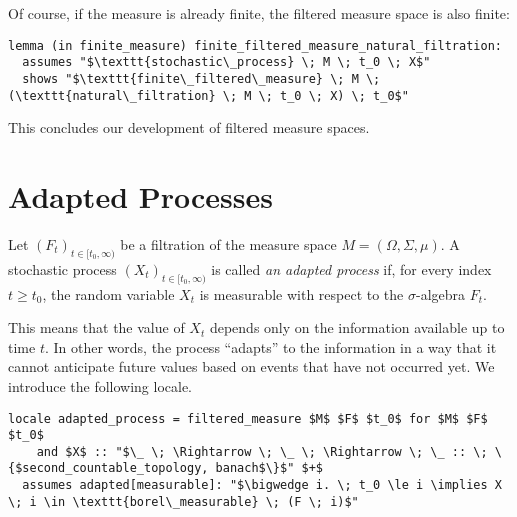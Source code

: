 Of course, if the measure is already finite, the filtered measure space is also finite:

\begin{isalemma}
{\small
\begin{lstlisting}[style=isabelle]
lemma (in finite_measure) finite_filtered_measure_natural_filtration:
  assumes "$\texttt{stochastic\_process} \; M \; t_0 \; X$"
  shows "$\texttt{finite\_filtered\_measure} \; M \; (\texttt{natural\_filtration} \; M \; t_0 \; X) \; t_0$"
\end{lstlisting}
}
\end{isalemma}

This concludes our development of filtered measure spaces.

\section{Adapted Processes}

\begin{definition}

Let $(F_t)_{t \in [t_0, \infty)}$ be a filtration of the measure space $M = (\Omega, \Sigma, \mu)$. A stochastic process $(X_t)_{t \in [t_0, \infty)}$ is called \textit{an adapted process} if, for every index $t \ge t_0$, the random variable $X_t$ is measurable with respect to the $\sigma$-algebra $F_t$.

\end{definition}

This means that the value of $X_t$ depends only on the information available up to time $t$. In other words, the process ``adapts'' to the information in a way that it cannot anticipate future values based on events that have not occurred yet. We introduce the following locale.

\begin{isalemma}
{\small
\begin{lstlisting}[style=isabelle]
locale adapted_process = filtered_measure $M$ $F$ $t_0$ for $M$ $F$ $t_0$ 
	and $X$ :: "$\_ \; \Rightarrow \; \_ \; \Rightarrow \; \_ :: \; \{$second_countable_topology, banach$\}$" $+$
  assumes adapted[measurable]: "$\bigwedge i. \; t_0 \le i \implies X \; i \in \texttt{borel\_measurable} \; (F \; i)$"
\end{lstlisting}
}
\end{isalemma}

